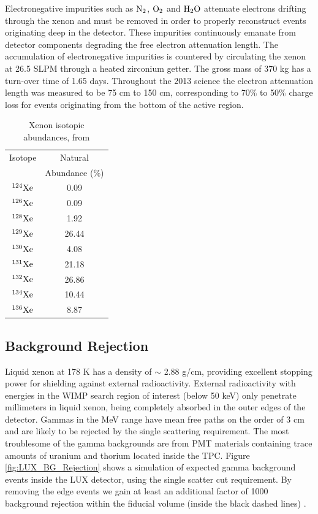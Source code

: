 Electronegative impurities such as $\rm N_2$, $\rm O_2$ and $\rm H_2O$ attenuate electrons drifting through the xenon and must be removed in order to properly reconstruct events originating deep in the detector. These impurities continuously emanate from detector components degrading the free electron attenuation length. The accumulation of electronegative impurities is countered by circulating the xenon at 26.5 SLPM through a heated zirconium getter. The gross mass of 370 kg has a turn-over time of 1.65 days. Throughout the 2013 science the electron attenuation length was measured to be 75 cm to 150 cm, corresponding to 70\% to 50\% charge loss for events originating from the bottom of the active region.

\renewcommand{\baselinestretch}{1}
\small\normalsize
\begin{table}[h!]
\begin{center}
\begin{tabular}{|c|c|}
\hline
Isotope & Natural \\
		& Abundance (\%) \\ \hline
$\rm^{124}Xe$ & 0.09 \\ \hline
$\rm^{126}Xe$ & 0.09 \\ \hline
$\rm^{128}Xe$ & 1.92 \\ \hline
$\rm^{129}Xe$ & 26.44 \\ \hline
$\rm^{130}Xe$ & 4.08 \\ \hline
$\rm^{131}Xe$ & 21.18 \\ \hline
$\rm^{132}Xe$ & 26.86 \\ \hline
$\rm^{134}Xe$ & 10.44 \\ \hline
$\rm^{136}Xe$ & 8.87 \\ \hline
\end{tabular}
\caption{Xenon isotopic abundances, from \cite{Xe_Isotopes}}
\label{table:Xe_Isotopes}
\end{center}
\end{table}
\renewcommand{\baselinestretch}{2}
\small\normalsize


\subsection{Background Rejection}
\label{sec:BG_Rejection}
Liquid xenon at 178 K has a density of $\sim$ 2.88 g/cm, providing excellent stopping power for shielding against external radioactivity. External radioactivity with energies in the WIMP search region of interest (below 50 keV) only penetrate millimeters in liquid xenon, being completely absorbed in the outer edges of the detector. Gammas in the MeV range have mean free paths on the order of 3 cm and are likely to be rejected by the single scattering requirement. The most troublesome of the gamma backgrounds are from PMT materials containing trace amounts of uranium and thorium located inside the TPC. Figure \ref{fig:LUX_BG_Rejection} shows a simulation of expected gamma background events inside the LUX detector, using the single scatter cut requirement. By removing the edge events we gain at least an additional factor of 1000 background rejection within the fiducial volume (inside the black dashed lines) \cite{LUX_BG}.

